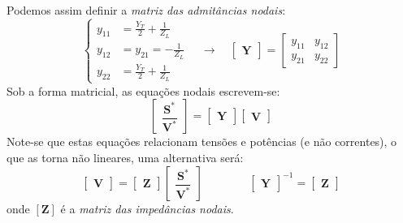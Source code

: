\begin{mdframed}
    Podemos assim definir a \textit{matriz das admitâncias nodais}:
    $$
    \left\{
    \begin{aligned}
        y_{11} &= \frac{Y_T}{2} + \frac{1}{Z_L}\\
        y_{12} &= y_{21} = -\frac{1}{Z_L}\\
        y_{22} &= \frac{Y_T}{2} + \frac{1}{Z_L}
    \end{aligned}
    \right.\quad\xrightarrow{}\quad
    \begin{bmatrix}
        \mathbf{Y}
    \end{bmatrix}
    =
    \begin{bmatrix}
        y_{11} & y_{12} \\[6pt]
        y_{21} & y_{22}
    \end{bmatrix}
    $$
    Sob a forma matricial, as equações nodais escrevem-se:
    $$
    \begin{bmatrix}
        \dfrac{\mathbf{S}^*}{\mathbf{V}^*}
    \end{bmatrix} =
    \begin{bmatrix}
        \mathbf{Y}
    \end{bmatrix}
    \begin{bmatrix}
        \mathbf{V}
    \end{bmatrix}
    $$
    Note-se que estas equações relacionam tensões e potências (e não correntes), o que as torna não lineares, uma alternativa será:
    $$
    \begin{bmatrix}
        \mathbf{V}
    \end{bmatrix} =
    \begin{bmatrix}
        \mathbf{Z}
    \end{bmatrix}
    \begin{bmatrix}
        \dfrac{\mathbf{S}^*}{\mathbf{V}^*}
    \end{bmatrix}
    \qquad\qquad
    \begin{bmatrix}
        \mathbf{Y}
    \end{bmatrix}^{-1} = 
    \begin{bmatrix}
        \mathbf{Z}
    \end{bmatrix}
    $$
    onde $[\mathbf{Z}]$ é a \textit{matriz das impedâncias nodais}.
\end{mdframed}

